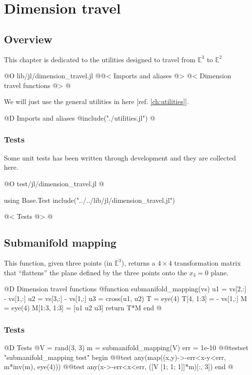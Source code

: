 
\chapter{Dimension travel}
\label{ch:dimension_travel}

\section{Overview}

This chapter is dedicated to
the utilities designed to travel
from $\mathbb{E}^3$ to $\mathbb{E}^2$

@O lib/jl/dimension_travel.jl
@{@< Imports and aliases @>
@< Dimension travel functions @>
@}

We will just use the general utilities
in here [ref. \ref{ch:utilities}].

@D Imports and aliases
@{include("./utilities.jl")
@}
\subsection{Tests}

Some unit tests has been written through development and
they are collected here.

@O test/jl/dimension_travel.jl
@{using Base.Test
include("../../lib/jl/dimension_travel.jl")

@< Tests @>
@}


\section{Submanifold mapping}
\label{sec:submanifold_mapping}

This function, given three points (in $\mathbb{E}^3$), 
returns a $4\times4$ transformation matrix that ``flattens''
the plane defined by the three points onto the $x_3=0$ plane.

@D Dimension travel functions
@{function submanifold_mapping(vs)
    u1 = vs[2,:] - vs[1,:]
    u2 = vs[3,:] - vs[1,:]
    u3 = cross(u1, u2)
    T = eye(4)
    T[4, 1:3] = - vs[1,:]
    M = eye(4)
    M[1:3, 1:3] = [u1 u2 u3]
    return T*M
end
@}
\subsection{Tests}

@D Tests
@{V = rand(3, 3)
m = submanifold_mapping(V)
err = 1e-10 
@@testset "submanifold_mapping test" begin
    @@test any(map((x,y)->-err<x-y<err, m*inv(m), eye(4)))
    @@test any(x->-err<x<err, ([V [1; 1; 1]]*m)[:, 3])
end
@}





